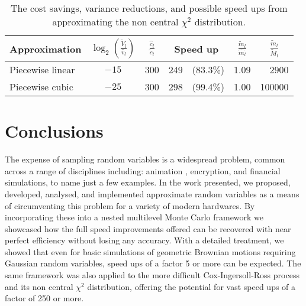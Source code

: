 \documentclass[manuscript,review]{acmart}
\begin{document}
\begin{table}[htb]
\caption{The cost savings, variance reductions, and possible speed ups from approximating the non central $ \chi^2 $ distribution.}
\label{tab:savings_chi}
\begin{tabular}{lcclrcr}
Approximation  & $ {\log}_2 \left(\tfrac{\tilde{V}_l}{\hat{v}_l}\right) $ & $ \tfrac{\hat{c}_l}{\tilde{c}_l} $ & \multicolumn{2}{c}{Speed up} & $ \tfrac{\tilde{m}_l}{\hat{m}_l} $ & \multicolumn{1}{c}{$ \tfrac{\tilde{m}_l}{\tilde{M}_l} $} \\[0.5em]
\hline
Piecewise linear  & $ -15 $ & 300 & 249 & (83.3\%) & 1.09 & 2900 \\
Piecewise cubic  & $ -25 $ & 300 & 298 & (99.4\%)& 1.00 & 100000  
\end{tabular}
\end{table}

\section{Conclusions}
\label{sec:conclusions}

The expense of sampling random variables is a widespread problem, common across a range of disciplines including: animation \citep{lee2017vectorized}, encryption, and financial simulations, to name just a few examples. In the work presented, we proposed, developed, analysed, and implemented approximate random variables as a means of circumventing this problem for a variety of modern hardwares. By incorporating these into a nested multilevel Monte Carlo framework we showcased how the full speed improvements offered can be recovered with near perfect efficiency without losing any accuracy. With a detailed treatment, we showed that even for basic simulations of geometric Brownian motions requiring Gaussian random variables, speed ups of a factor 5 or more can be expected. The same framework was also applied to the more difficult Cox-Ingersoll-Ross process and its non central $ \chi^2 $ distribution, offering the potential for vast speed ups of a factor of 250 or more. 
\end{document}
